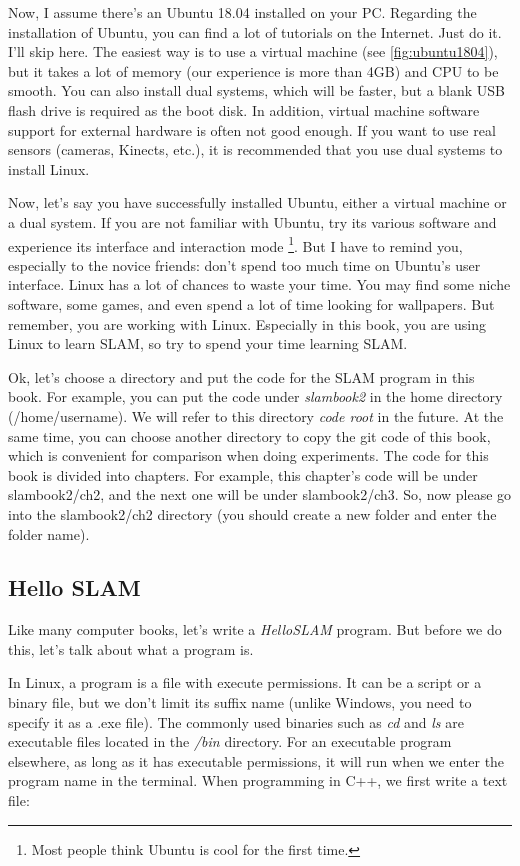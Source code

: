 Now, I assume there's an Ubuntu 18.04 installed on your PC. Regarding the installation of Ubuntu, you can find a lot of tutorials on the Internet. Just do it. I'll skip here. The easiest way is to use a virtual machine (see \autoref{fig:ubuntu1804}), but it takes a lot of memory (our experience is more than 4GB) and CPU to be smooth. You can also install dual systems, which will be faster, but a blank USB flash drive is required as the boot disk. In addition, virtual machine software support for external hardware is often not good enough. If you want to use real sensors (cameras, Kinects, etc.), it is recommended that you use dual systems to install Linux.

Now, let's say you have successfully installed Ubuntu, either a virtual machine or a dual system. If you are not familiar with Ubuntu, try its various software and experience its interface and interaction mode \footnote{Most people think Ubuntu is cool for the first time. }. But I have to remind you, especially to the novice friends: don't spend too much time on Ubuntu's user interface. Linux has a lot of chances to waste your time. You may find some niche software, some games, and even spend a lot of time looking for wallpapers. But remember, you are working with Linux. Especially in this book, you are using Linux to learn SLAM, so try to spend your time learning SLAM.

Ok, let's choose a directory and put the code for the SLAM program in this book. For example, you can put the code under \textit{slambook2} in the home directory (/home/username). We will refer to this directory \textit{code root} in the future. At the same time, you can choose another directory to copy the git code of this book, which is convenient for comparison when doing experiments. The code for this book is divided into chapters. For example, this chapter's code will be under slambook2/ch2, and the next one will be under slambook2/ch3. So, now please go into the slambook2/ch2 directory (you should create a new folder and enter the folder name).

\subsection{Hello SLAM}
Like many computer books, let's write a \textit{HelloSLAM} program. But before we do this, let's talk about what a program is.

In Linux, a program is a file with execute permissions. It can be a script or a binary file, but we don't limit its suffix name (unlike Windows, you need to specify it as a .exe file). The commonly used binaries such as \textit{cd} and \textit{ls} are executable files located in the \textit{/bin} directory. For an executable program elsewhere, as long as it has executable permissions, it will run when we enter the program name in the terminal. When programming in C++, we first write a text file:

